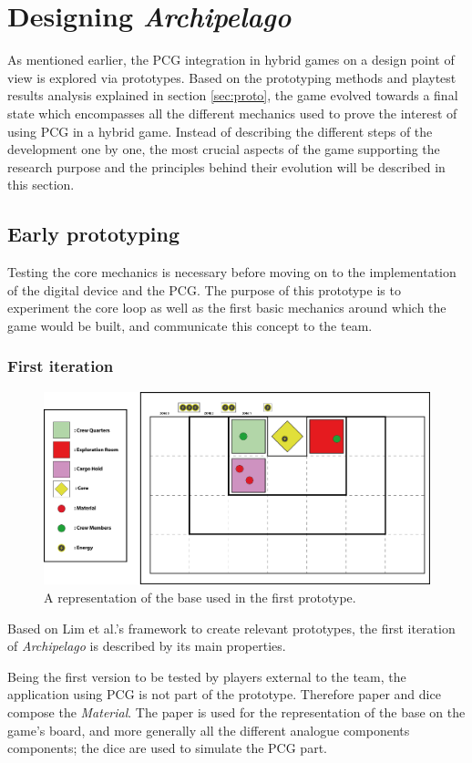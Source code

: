 \section{Designing \textit{Archipelago}}
As mentioned earlier, the PCG integration in hybrid games on a design point of view is explored via prototypes. Based on the prototyping methods and playtest results analysis explained in section \ref{sec:proto}, the game evolved towards a final state which encompasses all the different mechanics used to prove the interest of using PCG in a hybrid game. Instead of describing the different steps of the development one by one, the most crucial aspects of the game supporting the research purpose and the principles behind their evolution will be described in this section.  
\subsection{Early prototyping}
Testing the core mechanics is necessary before moving on to the implementation of the digital device and the PCG. The purpose of this prototype is to experiment the core loop as well as the first basic mechanics around which the game would be built, and communicate this concept to the team.
\subsubsection{First iteration}
\begin{figure}[h]
    \centering
    \includegraphics[scale=0.5]{Images/Board1.png}
    \caption{A representation of the base used in the first prototype.}
    \label{fig:base1}
\end{figure}
Based on Lim et al.'s framework to create relevant prototypes, the first iteration of \textit{Archipelago} is described by its main properties.

Being the first version to be tested by players external to the team, the application using PCG is not part of the prototype. Therefore paper and dice compose the \textit{Material}. The paper is used for the representation of the base on the game's board, and more generally all the different analogue components components; the dice are used to simulate the PCG part. 

